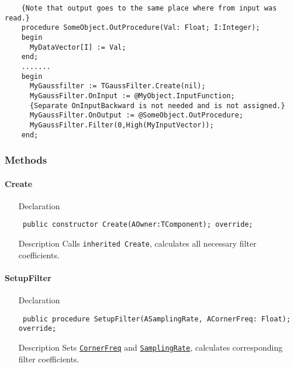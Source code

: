 \documentclass[12pt,a4paper,oneside]{report}
\newcommand{\declarationitem}[1]{{\addfontfeatures{FakeSlant} #1}}
\newcommand{\descriptiontitle}[1]{{\addfontfeatures{FakeSlant}#1}}
\newcommand{\code}[1]{\texttt{#1}}
\begin{document}
\begin{itemize}
\begin{verbatim}
	{Note that output goes to the same place where from input was read.}
	procedure SomeObject.OutProcedure(Val: Float; I:Integer);
	begin
	  MyDataVector[I] := Val;
	end;
	.......
	begin
	  MyGaussfilter := TGaussFilter.Create(nil);
	  MyGaussFilter.OnInput := @MyObject.InputFunction;
	  {Separate OnInputBackward is not needed and is not assigned.}
	  MyGaussFilter.OnOutput := @SomeObject.OutProcedure;
	  MyGaussFilter.Filter(0,High(MyInputVector));
	end;
\end{verbatim}	
\end{itemize}	

\subsubsection{Methods}
\paragraph{Create}
\label{lmfilters.TGaussFilter-Create}
\begin{itemize}\item[\declarationitem{Declaration}\hfill]
	\begin{flushleft}
		\code{
			public constructor Create(AOwner:TComponent); override;}
	\end{flushleft}
\item[\descriptiontitle{Description}] Calls \code{inherited Create}, calculates all necessary filter coefficients.
\end{itemize}
\paragraph{SetupFilter}
\label{lmfilters.TGaussFilter-SetupFilter}
\begin{itemize}\item[\declarationitem{Declaration}\hfill]
	\begin{flushleft}
		\code{
			public procedure SetupFilter(ASamplingRate, ACornerFreq: Float); override;}
	\end{flushleft}
\item[\descriptiontitle{Description}] Sets \hyperref[lmfilters.TOneFreqFilter-Cutfreq1]{\code{CornerFreq}}  and \hyperref[lmfilters.TOneFreqFilter-SamplingRate]{\code{SamplingRate}}, calculates corresponding filter coefficients. 
\end{itemize}
\end{document}

